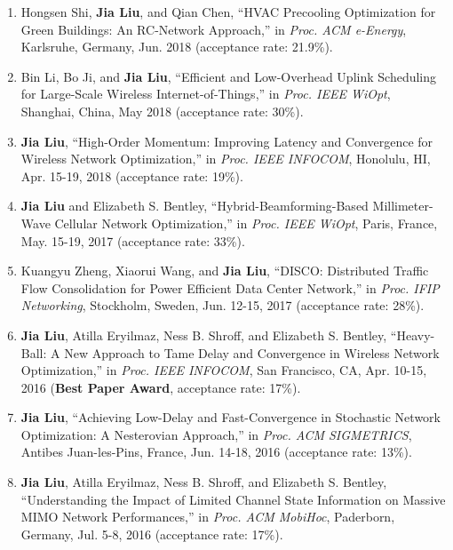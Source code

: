 \documentclass[overlapped,line,letterpaper]{res1}
\begin{document}
\begin{resume}
\begin{enumerate}
\vspace*{.08in} \item Hongsen Shi, \textbf{Jia Liu}, and Qian Chen, ``HVAC Precooling Optimization for Green Buildings: An RC-Network Approach,'' in {\em Proc. ACM e-Energy}, Karlsruhe, Germany, Jun. 2018 (acceptance rate: 21.9\%).

\vspace*{.08in} \item Bin Li, Bo Ji, and \textbf{Jia Liu}, ``Efficient and Low-Overhead Uplink Scheduling for Large-Scale Wireless Internet-of-Things,'' in {\em Proc. IEEE WiOpt}, Shanghai, China, May 2018 (acceptance rate: 30\%).

\vspace*{.08in} \item \textbf{Jia Liu}, ``High-Order Momentum: Improving Latency and Convergence for Wireless Network Optimization,'' in {\em Proc. IEEE INFOCOM}, Honolulu, HI, Apr. 15-19, 2018 (acceptance rate: 19\%).

\vspace*{.08in} \item \textbf{Jia Liu} and Elizabeth S. Bentley, ``Hybrid-Beamforming-Based Millimeter-Wave Cellular Network Optimization,'' in {\em Proc. IEEE WiOpt}, Paris, France, May. 15-19, 2017 (acceptance rate: 33\%).

\vspace*{.08in} \item Kuangyu Zheng, Xiaorui Wang, and \textbf{Jia Liu}, ``DISCO: Distributed Traffic Flow Consolidation for Power Efficient Data Center Network,'' in {\em Proc. IFIP Networking}, Stockholm, Sweden, Jun. 12-15, 2017 (acceptance rate: 28\%).

\vspace*{.08in} \item \textbf{Jia Liu}, Atilla Eryilmaz, Ness B. Shroff, and Elizabeth S. Bentley, ``Heavy-Ball: A New Approach to Tame Delay and Convergence in Wireless Network Optimization,'' in {\em Proc. IEEE INFOCOM}, San Francisco, CA, Apr. 10-15, 2016 ({\bf Best Paper Award}, acceptance rate: 17\%).

\vspace*{.08in} \item \textbf{Jia Liu}, ``Achieving Low-Delay and Fast-Convergence in Stochastic Network Optimization: A Nesterovian Approach,'' in {\em Proc. ACM SIGMETRICS}, Antibes Juan-les-Pins, France, Jun. 14-18, 2016 (acceptance rate: 13\%).

\vspace*{.08in} \item \textbf{Jia Liu}, Atilla Eryilmaz, Ness B. Shroff, and Elizabeth S. Bentley, ``Understanding the Impact of Limited Channel State Information on Massive MIMO Network Performances,'' in {\em Proc. ACM MobiHoc}, Paderborn, Germany, Jul. 5-8, 2016 (acceptance rate: 17\%).


\end{enumerate}
\end{resume}
\end{document}
